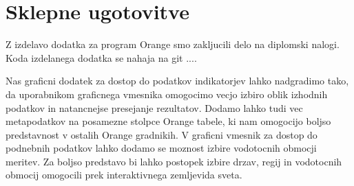 \chapter{Sklepne ugotovitve}



Z izdelavo dodatka za program Orange smo zakljucili delo na diplomski nalogi.
Koda izdelanega dodatka se nahaja na git ....


% 
%
%
%
%


Nas graficni dodatek za dostop do podatkov indikatorjev lahko nadgradimo tako,
da uporabnikom graficnega vmesnika omogocimo vecjo izbiro oblik izhodnih
podatkov in natancnejse presejanje rezultatov. Dodamo lahko tudi vec
metapodatkov na posamezne stolpce Orange tabele, ki nam omogocijo boljso
predstavnost v ostalih Orange gradnikih. V graficni vmesnik za dostop do
podnebnih podatkov lahko dodamo se moznost izbire vodotocnih obmocji meritev.
Za boljso predstavo bi lahko postopek izbire drzav, regij in vodotocnih
obmocij omogocili prek interaktivnega zemljevida sveta.
